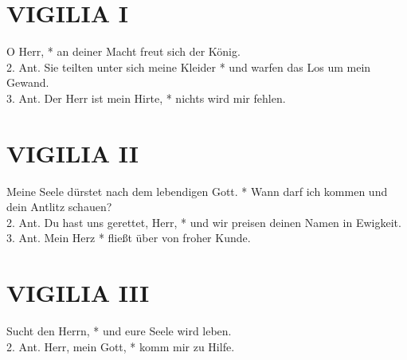 \section{VIGILIA I}

\begin{sloppypar}

{ O Herr, * an deiner Macht freut sich der König. \\
2. Ant. Sie teilten unter sich meine Kleider * und warfen das Los um mein Gewand. \\
3. Ant. Der Herr ist mein Hirte, * nichts wird mir fehlen. \\}
\end{sloppypar}

\medskip

\begin{flushleft}


\end{flushleft}

\newpage

\section{VIGILIA II}

\begin{sloppypar}
{ Meine Seele dürstet nach dem lebendigen Gott. * Wann darf ich kommen und dein Antlitz schau\-en? \\
2. Ant. Du hast uns gerettet, Herr, * und wir preisen deinen Namen in Ewigkeit. \\
3. Ant. Mein Herz * fließt über von froher Kunde. }
\end{sloppypar}

\begin{flushleft}


\end{flushleft}

\section{VIGILIA III}

\begin{sloppypar}
{ Sucht den Herrn, * und eure Seele wird leben.
       \\         
2. Ant. Herr, mein Gott, * komm mir zu Hilfe. }
\end{sloppypar}

